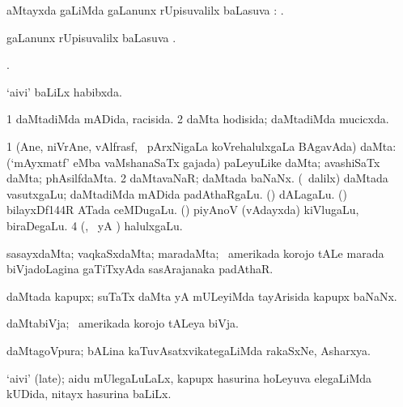 \bentry
{}
\gl{\uparx}
\bmng
{} aMtayxda \gu gaLiMda \kirxvi gaLanunx rUpisuvalilx baLasuva \uparx: . 
\emng
\eentry

\bentry
{}
\gl{\uparx}
\bmng
\nA gaLanunx rUpisuvalilx baLasuva \uparx. 
\emng
\eentry

\bentry
{}
\gl{\saMkiSx}
\bmng
{}. 
\emng
\eentry

\bentry
{}
\gl{\gu}
\bmng
`aivi' baLiLx habibxda. 
\emng
\eentry

\bentry
{}
\gl{\gu}
\bmng
\bnum
\num{1} daMtadiMda mADida, racisida. 
\num{2} daMta hodisida; daMtadiMda mucicxda. 
\enum
\emng
\eentry

\bentry
{}
\gl{\nA}
\bmng
\bnum
\num{1} (Ane, niVrAne, vAlfrasf, \mo\ pArxNigaLa koVrehalulxgaLa BAgavAda) daMta:  (`mAyxmatf' eMba vaMshanaSaTx gajada) paLeyuLike daMta; avashiSaTx daMta; phAsilfdaMta. 
\num{2} daMtavaNaR; daMtada baNaNx. 
 (\sA\ \bava dalilx) 
\banum
{} daMtada vasutxgaLu; daMtadiMda mADida padAthaRgaLu. 
 (\ashi) dALagaLu. 
 (\ashi) bilayxDf\char144R ATada ceMDugaLu. 
 (\ashi) piyAnoV (vAdayxda) kiVlugaLu, biraDegaLu. 
\eanum
\numie
\num{4} (\ashi, \Eva\ yA \bava) halulxgaLu. 
\enum
\emng

\noindent 
\gl{\pagu}
\bmng
{} 
 sasayxdaMta; vaqkaSxdaMta; maradaMta; \da\ amerikada korojo tALe marada biVjadoLagina gaTiTxyAda sasArajanaka padAthaR. 
\emng
\eentry

\bentry
{}
\gl{\nA}
\bmng
daMtada kapupx; suTaTx daMta yA mULeyiMda tayArisida kapupx baNaNx. 
\emng
\eentry

\bentry
{}
\gl{\nA}
\bmng
daMtabiVja; \da\ amerikada korojo tALeya biVja. 
\emng
\eentry

\bentry
{}
\gl{\nA}
\bmng
daMtagoVpura; bALina kaTuvAsatxvikategaLiMda rakaSxNe, Asharxya. 
\emng
\eentry

\bentry
{}
\gl{\nA}
\bmng
`aivi' (late); aidu mUlegaLuLaLx, kapupx hasurina hoLeyuva elegaLiMda kUDida, nitayx hasurina baLiLx.   
\emng
\eentry


